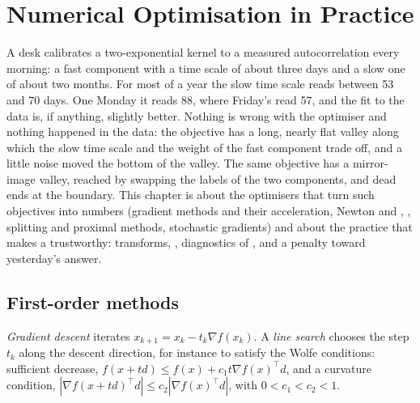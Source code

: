 \chapter{Numerical Optimisation in Practice}\label{ch:qm:numerical-optimisation-in-practice}

A desk calibrates a two-exponential kernel to a measured autocorrelation every morning: a fast component with a time scale of about three days
and a slow one of about two months. For most of a year the slow time scale reads between 53 and 70 days. One Monday it reads 88, where Friday's
read 57, and the fit to the data is, if anything, slightly better. Nothing is wrong with the optimiser and nothing happened in the data: the
objective has a long, nearly flat valley along which the slow time scale and the weight of the fast component trade off, and a little noise moved the
bottom of the valley. The same objective has a mirror-image valley, reached by swapping the labels of the two components, and dead ends at the
boundary. This chapter is about the optimisers that turn such objectives into numbers (gradient methods and their acceleration, Newton and
, , splitting and proximal methods, stochastic gradients) and about the practice that makes a
 trustworthy: transforms, , diagnostics of , and a penalty toward yesterday's answer.

\section{First-order methods}

\begin{definition}\label{def:qm:numerical-optimisation-in-practice:gd}
\emph{Gradient descent} iterates $x_{k+1} = x_k - t_k\nabla f(x_k)$. A \emph{line search} chooses the step $t_k$ along the
descent direction, for instance to satisfy the Wolfe conditions: sufficient decrease, $f(x + td) \le f(x) + c_1t\nabla f(x)^\top d$, and a curvature condition,
$|\nabla f(x + td)^\top d| \le c_2|\nabla f(x)^\top d|$, with $0 < c_1 < c_2 < 1$.
\end{definition}

